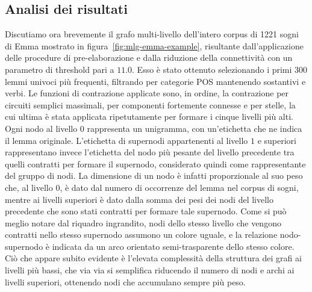 \subsection{Analisi dei risultati}\label{subsec:analisi-del-grafo-multi-livello}

Discutiamo ora brevemente il grafo multi-livello dell'intero corpus di 1221 sogni di Emma mostrato in
figura~\ref{fig:mlg-emma-example}, risultante dall'applicazione delle procedure di pre-elaborazione e dalla riduzione
della connettività con un parametro di threshold pari a $11.0$.
Esso è stato ottenuto selezionando i primi 300 lemmi univoci più frequenti, filtrando per categorie POS mantenendo
sostantivi e verbi.
Le funzioni di contrazione applicate sono, in ordine, la contrazione per circuiti semplici massimali,
per componenti fortemente connesse e per stelle, la cui ultima è stata applicata ripetutamente per
formare i cinque livelli più alti.
Ogni nodo al livello $0$ rappresenta un unigramma, con un'etichetta che ne indica il lemma originale. L'etichetta di
supernodi appartenenti al livello $1$ e superiori rappresentano invece l'etichetta del nodo più pesante del livello
precedente tra quelli contratti per formare il supernodo, considerato quindi come rappresentante del gruppo di nodi.
La dimensione di un nodo è infatti proporzionale al suo peso che, al livello $0$, è dato dal numero di occorrenze del
lemma nel corpus di sogni, mentre ai livelli superiori è dato dalla somma dei pesi dei nodi del livello precedente che
sono stati contratti per formare tale supernodo.
Come si può meglio notare dal riquadro ingrandito, nodi dello stesso livello che vengono contratti nello stesso
supernodo assumono un colore uguale, e la relazione nodo-supernodo è indicata da un arco orientato
semi-trasparente dello stesso colore.
Ciò che appare subito evidente è l'elevata complessità della struttura dei grafi ai livelli più bassi, che
via via si semplifica riducendo il numero di nodi e archi ai livelli superiori, ottenendo nodi che accumulano
sempre più peso.

